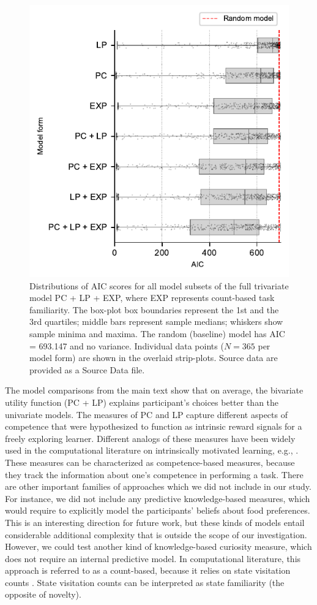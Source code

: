 \begin{subappendices}
\begin{figure}[t!]
    \centering
    \includegraphics[width=.75\columnwidth]{Figures/c4/fig_s6.pdf}
    \caption[short Appendix figure description]{Distributions of AIC scores for all model subsets of the full trivariate model \ac{PC} + \ac{LP} + \ac{EXP}, where \ac{EXP} represents count-based task familiarity. The box-plot box boundaries represent the 1st and the 3rd quartiles; middle bars represent sample medians; whiskers show sample minima and maxima. The random (baseline) model has AIC = 693.147 and no variance. Individual data points ($N=365$ per model form) are shown in the overlaid strip-plots. Source data are provided as a Source Data file.}
    \label{fig:CH4A_6_familiarity_component}
\end{figure}

The model comparisons from the main text show that on average, the bivariate utility function (\ac{PC} + \ac{LP}) explains participant’s choices better than the univariate models. The measures of \ac{PC} and \ac{LP} capture different aspects of competence that were hypothesized to function as intrinsic reward signals for a freely exploring learner. Different analogs of these measures have been widely used in the computational literature on intrinsically motivated learning, e.g., \parencite{colas_curious_2019,bougie_skill-based_2019}. These measures can be characterized as competence-based measures, because they track the information about one’s competence in performing a task. There are other important families of approaches which we did not include in our study. For instance, we did not include any predictive knowledge-based measures, which would require to explicitly model the participants’ beliefs about food preferences. This is an interesting direction for future work, but these kinds of models entail considerable additional complexity that is outside the scope of our investigation. However, we could test another kind of knowledge-based curiosity measure, which does not require an internal predictive model. In computational literature, this approach is referred to as a count-based, because it relies on state visitation counts \parencite{bellemare_unifying_2016}. State visitation counts can be interpreted as state familiarity (the opposite of novelty).


\end{subappendices}
